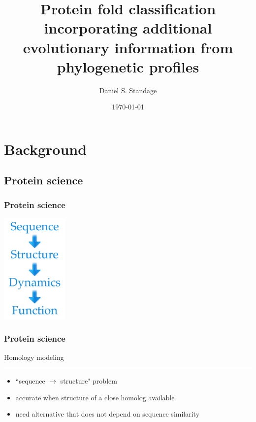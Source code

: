 \documentclass{beamer}
\title[Protein fold classification]{Protein fold classification incorporating additional evolutionary information from phylogenetic profiles}
\author{Daniel S. Standage}
\date{\today}
\institute[BCB 569]{BCB 569}
\begin{document}
 

\begin{frame}
  \titlepage
\end{frame}

\section{Background}
\subsection{Protein science}
\begin{frame}
  \frametitle{Protein science}
  \begin{center}
    \includegraphics[width=125px]{paradigm.jpg}
  \end{center}
\end{frame}
\begin{frame}
  \frametitle{Protein science}
  
  {\LARGE Homology modeling}
  \vspace{1px}
  \hrule
  \vspace{5px}
  \begin{itemize}
    \item ``sequence $\rightarrow$ structure" problem
    \item accurate when structure of a close homolog available
    \item need alternative that does not depend on sequence similarity
  \end{itemize}
\end{frame}
\end{document}
